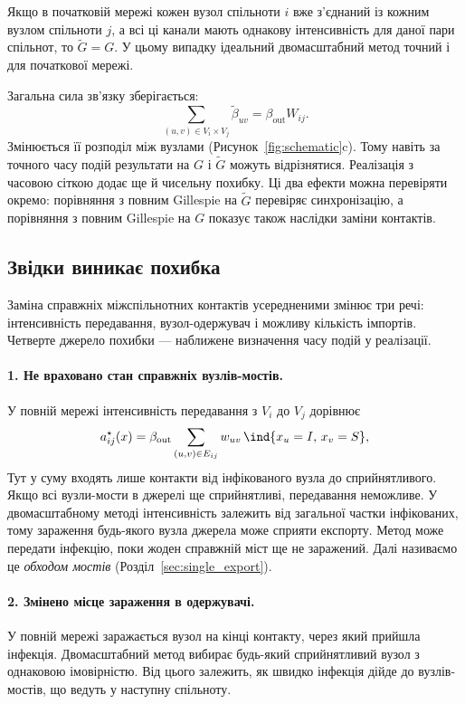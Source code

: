 \begin{corollary}
\label{cor:exact}
Якщо в початковій мережі кожен вузол спільноти $i$ вже з'єднаний із кожним вузлом спільноти $j$, а всі ці канали мають однакову інтенсивність для даної пари спільнот, то $\tilde G=G$. У цьому випадку ідеальний двомасштабний метод точний і для початкової мережі.
\end{corollary}

Загальна сила зв'язку зберігається:
\[
\sum_{(u,v)\in V_i\times V_j}\tilde\beta_{uv}=\beta_{\mathrm{out}}W_{ij}.
\]
Змінюється її розподіл між вузлами (Рисунок~\ref{fig:schematic}c). Тому навіть за точного часу подій результати на $G$ і $\tilde G$ можуть відрізнятися. Реалізація з часовою сіткою додає ще й чисельну похибку. Ці два ефекти можна перевіряти окремо: порівняння з повним Gillespie на $\tilde G$ перевіряє синхронізацію, а порівняння з повним Gillespie на $G$ показує також наслідки заміни контактів.

\subsection{Звідки виникає похибка}
\label{sec:sources}

Заміна справжніх міжспільнотних контактів усередненими змінює три речі: інтенсивність передавання, вузол-одержувач і можливу кількість імпортів. Четверте джерело похибки --- наближене визначення часу подій у реалізації.

\paragraph{1. Не враховано стан справжніх вузлів-мостів.}
У повній мережі інтенсивність передавання з $V_i$ до $V_j$ дорівнює
\begin{equation}
\label{eq:exact_rate}
a^\star_{ij}(x)=\beta_{\mathrm{out}}\sum_{(u,v)\in E_{ij}}w_{uv}\,\ind\{x_u=I,\,x_v=S\},
\end{equation}
Тут у суму входять лише контакти від інфікованого вузла до сприйнятливого. Якщо всі вузли-мости в джерелі ще сприйнятливі, передавання неможливе. У двомасштабному методі інтенсивність залежить від загальної частки інфікованих, тому зараження будь-якого вузла джерела може сприяти експорту. Метод може передати інфекцію, поки жоден справжній міст ще не заражений. Далі називаємо це \emph{обходом мостів} (Розділ~\ref{sec:single_export}).

\paragraph{2. Змінено місце зараження в одержувачі.}
У повній мережі заражається вузол на кінці контакту, через який прийшла інфекція. Двомасштабний метод вибирає будь-який сприйнятливий вузол з однаковою імовірністю. Від цього залежить, як швидко інфекція дійде до вузлів-мостів, що ведуть у наступну спільноту.

